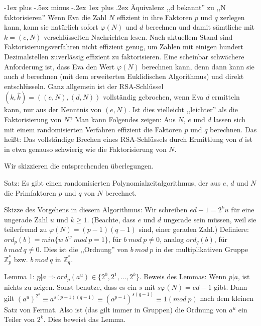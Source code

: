 \documentclass[a4paper]{article}
\makeatletter
\renewcommand{\subsubsection}{\@startsection{subsubsection}{3}{0mm}%
 {-1ex plus -.5ex minus -.2ex}%
 {1ex plus .2ex}%
 {\normalfont\small\bfseries}}
\makeatother
\begin{document}
\begin{multicols}{3}
        \subsubsection{Äquivalenz ,,d bekannt'' zu ,,N faktorisieren''}
        Wenn Eva die Zahl $N$ effizient in ihre Faktoren $p$ und $q$ zerlegen kann, kann sie natürlich sofort $\varphi(N)$ und $d$ berechnen und damit sämtliche mit $k=(e,N)$ verschlüsselten Nachrichten lesen. Nach aktuellem Stand sind Faktorisierungsverfahren nicht effizient genug, um Zahlen mit einigen hundert Dezimalstellen zuverlässig effizient zu faktorisieren.
        Eine scheinbar schwächere Anforderung ist, dass Eva den Wert $\varphi(N)$ berechnen kann, denn dann kann sie auch $d$ berechnen (mit dem erweiterten Euklidischen Algorithmus) und direkt entschlüsseln.
        Ganz allgemein ist der RSA-Schlüssel $(k,\hat{k}) = ((e,N),(d,N))$ vollständig gebrochen, wenn Eva $d$ ermitteln kann, nur aus der Kenntnis von $(e,N)$. Ist dies vielleicht ,,leichter'' als die Faktorisierung von $N$? Man kann Folgendes zeigen: Aus $N$, $e$ und $d$ lassen sich mit einem randomisierten Verfahren effizient die Faktoren $p$ und $q$ berechnen.
        Das heißt: Das vollständige Brechen eines RSA-Schlüssels durch Ermittlung von $d$ ist in etwa genauso schwierig wie die Faktorisierung von $N$.

        Wir skizzieren die entsprechenden überlegungen.

        Satz: Es gibt einen randomisierten Polynomialzeitalgorithmus, der aus $e$, $d$ und $N$ die Primfaktoren $p$ und $q$ von $N$ berechnet.

        Skizze des Vorgehens in diesem Algorithmus: Wir schreiben $ed-1 = 2^k u$ für eine ungerade Zahl $u$ und $k\geq 1$. (Beachte, dass $e$ und $d$ ungerade sein müssen, weil sie teilerfremd zu $\varphi(N) = (p-1)(q-1)$ sind, einer geraden Zahl.) Definiere: $ord_p(b) = min\{w|b^w\ mod\ p= 1\}$, für $b\ mod\ p\not= 0$, analog $ord_q(b)$, für $b\ mod\ q\not= 0$. Dies ist die ,,Ordnung'' von $b\ mod\ p$ in der multiplikativen Gruppe $\mathbb{Z}^*_p$ bzw. $b\ mod\ q$ in $\mathbb{Z}^*_q$.

        Lemma 1: $p\not| a\Rightarrow ord_p(a^u)\in\{2^0, 2^1,...,2^k\}$.
        Beweis des Lemmas: Wenn $p|a$, ist nichts zu zeigen. Sonst benutze, dass es ein $s$ mit $s\varphi(N) =ed-1$ gibt. Dann gilt $(a^u)^{2^k}\equiv a^{s(p-1)(q-1)}\equiv (a^{p-1})^{s(q-1)}\equiv 1 (mod\ p)$ nach dem kleinen Satz von Fermat. Also ist (das gilt immer in Gruppen) die Ordnung von $a^u$ ein Teiler von $2^k$. Dies beweist das Lemma.


\end{multicols}
\end{document}
